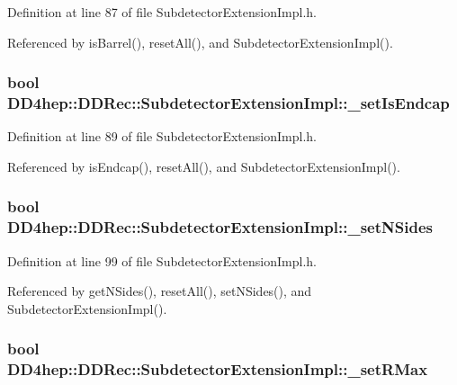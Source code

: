 Definition at line 87 of file SubdetectorExtensionImpl.h.

Referenced by isBarrel(), resetAll(), and SubdetectorExtensionImpl().\hypertarget{class_d_d4hep_1_1_d_d_rec_1_1_subdetector_extension_impl_ab96ac61e873d487a1837b4abe156869e}{
\subsubsection[{\_\-setIsEndcap}]{\setlength{\rightskip}{0pt plus 5cm}bool {\bf DD4hep::DDRec::SubdetectorExtensionImpl::\_\-setIsEndcap}}}
\label{class_d_d4hep_1_1_d_d_rec_1_1_subdetector_extension_impl_ab96ac61e873d487a1837b4abe156869e}


Definition at line 89 of file SubdetectorExtensionImpl.h.

Referenced by isEndcap(), resetAll(), and SubdetectorExtensionImpl().\hypertarget{class_d_d4hep_1_1_d_d_rec_1_1_subdetector_extension_impl_a1a8b0613327d2cac9e1783fcf7f22be9}{
\subsubsection[{\_\-setNSides}]{\setlength{\rightskip}{0pt plus 5cm}bool {\bf DD4hep::DDRec::SubdetectorExtensionImpl::\_\-setNSides}}}
\label{class_d_d4hep_1_1_d_d_rec_1_1_subdetector_extension_impl_a1a8b0613327d2cac9e1783fcf7f22be9}


Definition at line 99 of file SubdetectorExtensionImpl.h.

Referenced by getNSides(), resetAll(), setNSides(), and SubdetectorExtensionImpl().\hypertarget{class_d_d4hep_1_1_d_d_rec_1_1_subdetector_extension_impl_a8a23eb897b7a367cd183adddf88e8fe7}{
\subsubsection[{\_\-setRMax}]{\setlength{\rightskip}{0pt plus 5cm}bool {\bf DD4hep::DDRec::SubdetectorExtensionImpl::\_\-setRMax}}}
\label{class_d_d4hep_1_1_d_d_rec_1_1_subdetector_extension_impl_a8a23eb897b7a367cd183adddf88e8fe7}


